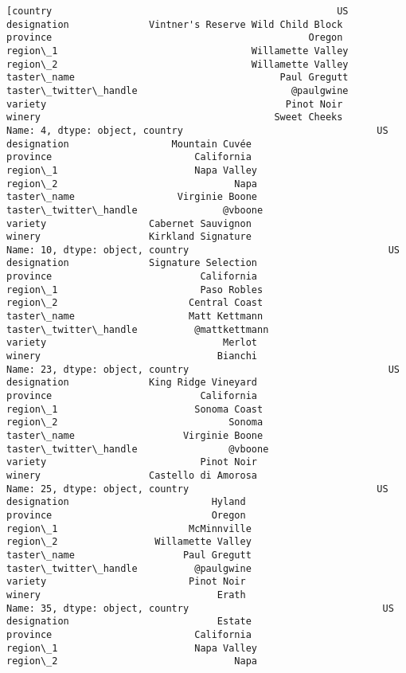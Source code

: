 \documentclass[11pt]{article}
\begin{document}
    \begin{Verbatim}[commandchars=\\\{\}]
[country                                                  US
designation              Vintner's Reserve Wild Child Block
province                                             Oregon
region\_1                                  Willamette Valley
region\_2                                  Willamette Valley
taster\_name                                    Paul Gregutt
taster\_twitter\_handle                           @paulgwine 
variety                                          Pinot Noir
winery                                         Sweet Cheeks
Name: 4, dtype: object, country                                  US
designation                  Mountain Cuvée
province                         California
region\_1                        Napa Valley
region\_2                               Napa
taster\_name                  Virginie Boone
taster\_twitter\_handle               @vboone
variety                  Cabernet Sauvignon
winery                   Kirkland Signature
Name: 10, dtype: object, country                                   US
designation              Signature Selection
province                          California
region\_1                         Paso Robles
region\_2                       Central Coast
taster\_name                    Matt Kettmann
taster\_twitter\_handle          @mattkettmann
variety                               Merlot
winery                               Bianchi
Name: 23, dtype: object, country                                   US
designation              King Ridge Vineyard
province                          California
region\_1                        Sonoma Coast
region\_2                              Sonoma
taster\_name                   Virginie Boone
taster\_twitter\_handle                @vboone
variety                           Pinot Noir
winery                   Castello di Amorosa
Name: 25, dtype: object, country                                 US
designation                         Hyland
province                            Oregon
region\_1                       McMinnville
region\_2                 Willamette Valley
taster\_name                   Paul Gregutt
taster\_twitter\_handle          @paulgwine 
variety                         Pinot Noir
winery                               Erath
Name: 35, dtype: object, country                                  US
designation                          Estate
province                         California
region\_1                        Napa Valley
region\_2                               Napa

\end{Verbatim}
\end{document}
